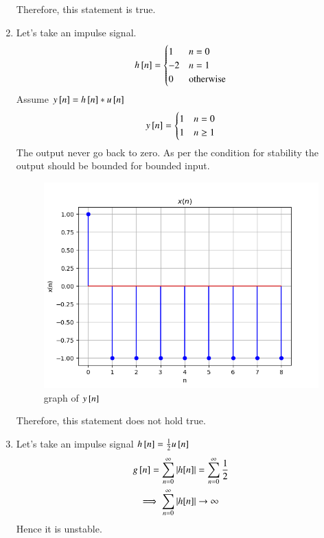 \documentclass[journal,12pt,twocolumn]{IEEEtran}
\theoremstyle{remark}
\begin{document}
\begin{enumerate}
    Therefore, this statement is true.
    \item Let's take an impulse signal.
    \begin{align}
            h{}\left[n\right] = \begin{cases} 
                1 & n = 0 \\
                -2 & n = 1 \\
              0 & \text{otherwise}
        \end{cases}
    \end{align}
    Assume $y{}\left[n\right]=h{}\left[n\right]*u{}\left[n\right]$
    \begin{align}
        y{}\left[n\right] = \begin{cases}
            1 & n=0\\
            1 & n\geq1
        \end{cases}
    \end{align}
    The output never go back to zero. As per the condition for stability the output should be bounded for bounded input.
    
    \begin{figure}[h!]
    \renewcommand\thefigure{1}
        \centering
        \includegraphics[width=0.8\linewidth]{figs/graph32.png}
        \caption{graph of $y{}\left[n\right]$}
    \end{figure}
    Therefore, this statement does not hold true.
    \item Let's take an impulse signal $h{}\left[n\right]=\frac{1}{2}u{}\left[n\right]$\\
    \begin{align}
        g{}\left[n\right]=\sum_{n=0}^{\infty}|h[n]|&=\sum_{n=0}^{\infty}\frac{1}{2}\\
        \implies\sum_{n=0}^{\infty}|h[n]|&\rightarrow \infty
    \end{align}
    Hence it is unstable.
    

\end{enumerate}
\end{document}
